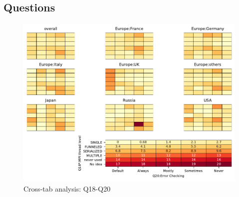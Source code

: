 
\subsection{Questions}


\begin{figure}
\begin{center}
\includegraphics[width=12cm]{../pdfs/Q18-Q20.pdf}
\caption{Cross-tab analysis: Q18-Q20}
\label{fig:Q18-Q20}
\end{center}
\end{figure}

